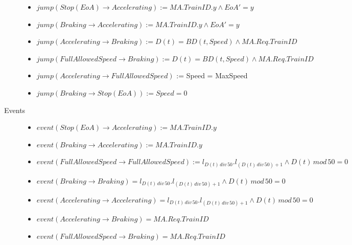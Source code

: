 \begin{mydef}
\begin{description}
\begin{itemize}
	\item $jump(Stop (EoA) \to Accelerating) := MA.TrainID.y \wedge EoA' = y$ 
	
	\item $jump(Braking \to Accelerating) := MA.TrainID.y \wedge EoA' = y$ 

	\item $jump(Accelerating \to Braking) := D(t) = BD(t, Speed) \wedge MA.Req.TrainID$

	\item $jump(Full Allowed Speed \to Braking) := D(t) = BD(t, Speed) \wedge MA.Req.TrainID$

	\item $jump(Accelerating \to Full Allowed Speed)$ := Speed = MaxSpeed
	
	\item $jump(Braking \to Stop (EoA)) := Speed = 0$

	\end{itemize}

\item[Events] \hspace*{0mm}
\begin{itemize}
	\item $event (Stop (EoA) \to Accelerating) := MA.TrainID.y$
	\item $event (Braking \to Accelerating) := MA.TrainID.y$
	\item $event(Full Allowed Speed \to Full Allowed Speed) := l_{D(t) \, div \, 50}.l_{(D(t) \, div \, 50) +1} \wedge D(t) \, mod \, 50 = 0$
\item $event(Braking \to Braking) = l_{D(t) \, div \, 50}.l_{(D(t) \, div \, 50) +1} \wedge D(t) \, mod \, 50 = 0$
\item $event(Accelerating \to Accelerating) = l_{D(t) \, div \, 50}.l_{(D(t) \, div \, 50) +1} \wedge D(t) \, mod \, 50 = 0$

	\item $event(Accelerating \to Braking) = MA.Req.TrainID$
	\item $event(Full Allowed Speed \to Braking) = MA.Req.TrainID$
\end{itemize}

\end{description}
\end{mydef}



